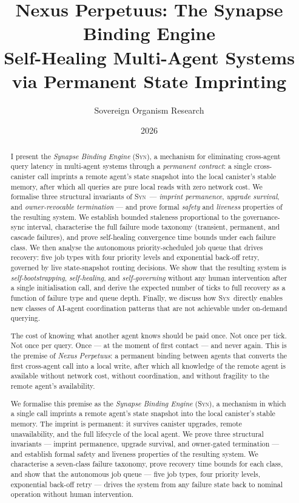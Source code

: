 \documentclass[11pt,a4paper]{article}
\title{\textbf{Nexus Perpetuus: The Synapse Binding Engine}\\
  \large Self-Healing Multi-Agent Systems via Permanent State Imprinting}
\author{Sovereign Organism Research}
\date{2026}
\newcommand{\SYN}{\textsc{Syn}}
\begin{document}
\maketitle

\begin{abstract}
I present the \emph{Synapse Binding Engine} (\SYN), a mechanism for eliminating
cross-agent query latency in multi-agent systems through a \emph{permanent
contract}: a single cross-canister call imprints a remote agent's state
snapshot into the local canister's stable memory, after which all queries are
pure local reads with zero network cost.  We formalise three structural
invariants of \SYN\ --- \emph{imprint permanence}, \emph{upgrade survival}, and
\emph{owner-revocable termination} --- and prove formal \emph{safety} and
\emph{liveness} properties of the resulting system.  We establish bounded
staleness proportional to the governance-sync interval, characterise the full
failure mode taxonomy (transient, permanent, and cascade failures), and prove
self-healing convergence time bounds under each failure class.  We then analyse
the autonomous priority-scheduled job queue that drives recovery: five job types
with four priority levels and exponential back-off retry, governed by live
state-snapshot routing decisions.  We show that the resulting system is
\emph{self-bootstrapping}, \emph{self-healing}, and \emph{self-governing}
without any human intervention after a single initialisation call, and derive
the expected number of ticks to full recovery as a function of failure type and
queue depth.  Finally, we discuss how \SYN\ directly enables new classes of
AI-agent coordination patterns that are not achievable under on-demand querying.

The cost of knowing what another agent knows should be paid once.  Not once
per tick.  Not once per query.  Once --- at the moment of first contact --- and
never again.  This is the premise of \emph{Nexus Perpetuus}: a permanent
binding between agents that converts the first cross-agent call into a local
write, after which all knowledge of the remote agent is available without
network cost, without coordination, and without fragility to the remote
agent's availability.

We formalise this premise as the \emph{Synapse Binding Engine} (\SYN), a
mechanism in which a single call imprints a remote agent's state snapshot
into the local canister's stable memory.  The imprint is permanent: it
survives canister upgrades, remote unavailability, and the full lifecycle of
the local agent.  We prove three structural invariants --- imprint permanence,
upgrade survival, and owner-gated termination --- and establish formal safety
and liveness properties of the resulting system.  We characterise a seven-class
failure taxonomy, prove recovery time bounds for each class, and show that the
autonomous job queue --- five job types, four priority levels, exponential
back-off retry --- drives the system from any failure state back to nominal
operation without human intervention.


\end{abstract}
\end{document}
